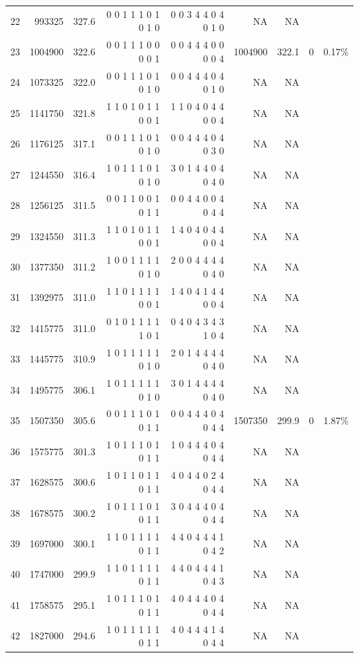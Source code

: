 \documentclass[10pt,journal,compsoc]{IEEEtran}
\begin{document}
\begin{table}[ht]
{\begin{tabular}{|*{9}{r|}}
22	&993325	&   327.6	&0 0 1 1 1 0 1 0 1 0	&0 0 3 4 4 0 4 0 1 0	&			NA	&NA&&\\
23	&1004900&   322.6	&0 0 1 1 1 0 0 0 0 1	&0 0 4 4 4 0 0 0 0 4	&	\cellcolor{blizzardblue}       1004900	&\cellcolor{blizzardblue}322.1&\cellcolor{blizzardblue}	0	&\cellcolor{blizzardblue}0.17\%\\
24	&1073325&   322.0	&0 0 1 1 1 0 1 0 1 0	&0 0 4 4 4 0 4 0 1 0	&			NA	&NA&&\\
25	&1141750&   321.8	&1 1 0 1 0 1 1 0 0 1	&1 1 0 4 0 4 4 0 0 4	&			NA	&NA&&\\
26	&1176125&   317.1	&0 0 1 1 1 0 1 0 1 0	&0 0 4 4 4 0 4 0 3 0	&			NA	&NA&&\\
27	&1244550&   316.4	&1 0 1 1 1 0 1 0 1 0	&3 0 1 4 4 0 4 0 4 0	&			NA	&NA&&\\
28	&1256125&   311.5	&0 0 1 1 0 0 1 0 1 1	&0 0 4 4 0 0 4 0 4 4	&			NA	&NA&&\\
29	&1324550&   311.3	&1 1 0 1 0 1 1 0 0 1	&1 4 0 4 0 4 4 0 0 4	&			NA	&NA&&\\
30	&1377350&   311.2	&1 0 0 1 1 1 1 0 1 0	&2 0 0 4 4 4 4 0 4 0	&			NA	&NA&&\\
31	&1392975&   311.0	&1 1 0 1 1 1 1 0 0 1	&1 4 0 4 1 4 4 0 0 4	&			NA	&NA&&\\
32	&1415775&   311.0	&0 1 0 1 1 1 1 1 0 1	&0 4 0 4 3 4 3 1 0 4	&			NA	&NA&&\\
33	&1445775&   310.9	&1 0 1 1 1 1 1 0 1 0	&2 0 1 4 4 4 4 0 4 0	&			NA	&NA&&\\
34	&1495775&   306.1	&1 0 1 1 1 1 1 0 1 0	&3 0 1 4 4 4 4 0 4 0	&			NA	&NA&&\\
35	&1507350&   305.6	&0 0 1 1 1 0 1 0 1 1	&0 0 4 4 4 0 4 0 4 4	&	  \cellcolor{blizzardblue}     1507350	&\cellcolor{blizzardblue}299.9	&\cellcolor{blizzardblue}0	&\cellcolor{blizzardblue}1.87\%\\
36	&1575775&   301.3	&1 0 1 1 1 0 1 0 1 1	&1 0 4 4 4 0 4 0 4 4	&			NA	&NA&&\\
37	&1628575&   300.6	&1 0 1 1 0 1 1 0 1 1	&4 0 4 4 0 2 4 0 4 4	&			NA	&NA&&\\
38	&1678575&   300.2	&1 0 1 1 1 0 1 0 1 1	&3 0 4 4 4 0 4 0 4 4	&			NA	&NA&&\\
39	&1697000&   300.1	&1 1 0 1 1 1 1 0 1 1	&4 4 0 4 4 4 1 0 4 2	&			NA	&NA&&\\
40	&1747000&   299.9	&1 1 0 1 1 1 1 0 1 1	&4 4 0 4 4 4 1 0 4 3	&			NA	&NA&&\\
41	&1758575&   295.1	&1 0 1 1 1 0 1 0 1 1	&4 0 4 4 4 0 4 0 4 4	&			NA	&NA&&\\
42	&1827000&   294.6	&1 0 1 1 1 1 1 0 1 1	&4 0 4 4 4 1 4 0 4 4	&			NA	&NA&&\\

\end{tabular}}
\end{table}
\end{document}
